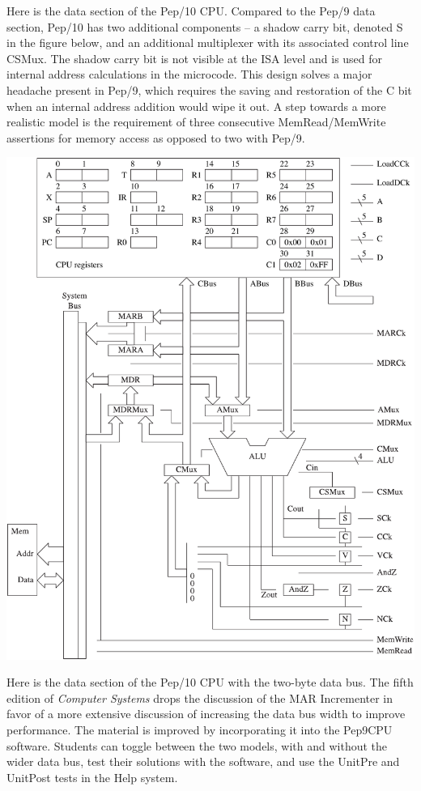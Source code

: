 \documentclass[10pt,fleqn]{book}
\begin{document}
\newpage

\noindent Here is the data section of the Pep/10 CPU.
Compared to the Pep/9 data section, Pep/10 has two additional components -- a shadow carry bit, denoted S in the figure below, and an additional multiplexer with its associated control line CSMux.
The shadow carry bit is not visible at the ISA level and is used for internal address calculations in the microcode.
This design solves a major headache present in Pep/9, which requires the saving and restoration of the C bit when an internal address addition would wipe it out.
A step towards a more realistic model is the requirement of three consecutive MemRead/MemWrite assertions for memory access as opposed to two with Pep/9.\\
\begin{center}
\includegraphics{pep10-1-byte-bus}
\end{center}

\newpage

\noindent Here is the data section of the Pep/10 CPU with the two-byte data bus.
The fifth edition of \textit{Computer Systems} drops the discussion of the MAR Incrementer in favor of a more extensive discussion of increasing the data bus width to improve performance.
The material is improved by incorporating it into the Pep9CPU software.
Students can toggle between the two models, with and without the wider data bus, test their solutions with the software, and use the UnitPre and UnitPost tests in the Help system.
\end{document}
